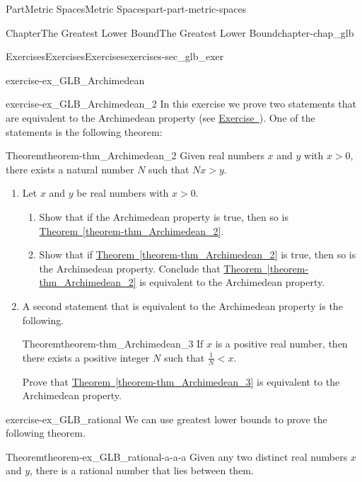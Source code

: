 \documentclass[oneside,10pt,]{book}
\newcommand{\xreffont}{\relax}
\numberwithin{equation}{chapter}
\newcommand{\lt}{<}
\newcommand{\gt}{>}
\begin{document}
\begin{partptx}{Part}{Metric Spaces}{}{Metric Spaces}{}{}{part-part-metric-spaces}
\begin{chapterptx}{Chapter}{The Greatest Lower Bound}{}{The Greatest Lower Bound}{}{}{chapter-chap_glb}
\begin{exercises-section}{Exercises}{Exercises}{}{Exercises}{}{}{exercises-sec_glb_exer}
\begin{divisionexercise}{5}{}{}{exercise-ex_GLB_Archimedean}
\begin{enumerate}[font=\bfseries,label=(\alph*),ref=\alph*]
\end{enumerate}%
\end{divisionexercise}%
\begin{divisionexercise}{6}{}{}{exercise-ex_GLB_Archimedean_2}%
In this exercise we prove two statements that are equivalent to the Archimedean property (see \hyperlink{exercise-ex_GLB_Archimedean}{Exercise~{\xreffont 5}}). One of the statements is the following theorem: \begin{theorem}{Theorem}{}{}{theorem-thm_Archimedean_2}%
Given real numbers \(x\) and \(y\) with \(x \gt 0\), there exists a natural number \(N\) such that \(Nx \gt y\).%
\end{theorem}
%
\begin{enumerate}[font=\bfseries,label=(\alph*),ref=\alph*]%
\item{}Let \(x\) and \(y\) be real numbers with \(x \gt 0\).%
\begin{enumerate}[font=\bfseries,label=(\roman*),ref=\theenumi.\roman*]%
\item{}Show that if the Archimedean property is true, then so is \hyperref[theorem-thm_Archimedean_2]{Theorem~{\xreffont\ref{theorem-thm_Archimedean_2}}}.%
\item{}Show that if \hyperref[theorem-thm_Archimedean_2]{Theorem~{\xreffont\ref{theorem-thm_Archimedean_2}}} is true, then so is the Archimedean property. Conclude that \hyperref[theorem-thm_Archimedean_2]{Theorem~{\xreffont\ref{theorem-thm_Archimedean_2}}} is equivalent to the Archimedean property.%
\end{enumerate}%
\item{}A second statement that is equivalent to the Archimedean property is the following. \begin{theorem}{Theorem}{}{}{theorem-thm_Archimedean_3}%
If \(x\) is a positive real number, then there exists a positive integer \(N\) such that \(\frac{1}{N} \lt x\).%
\end{theorem}
 Prove that \hyperref[theorem-thm_Archimedean_3]{Theorem~{\xreffont\ref{theorem-thm_Archimedean_3}}} is equivalent to the Archimedean property.%
\end{enumerate}%
\end{divisionexercise}%
\begin{divisionexercise}{7}{}{}{exercise-ex_GLB_rational}%
We can use greatest lower bounds to prove the following theorem. \begin{theorem}{Theorem}{}{}{theorem-ex_GLB_rational-a-a-a}%
Given any two distinct real numbers \(x\) and \(y\), there is a rational number that lies between them.%

\end{theorem}
\end{divisionexercise}
\end{exercises-section}
\end{chapterptx}
\end{partptx}
\end{document}
